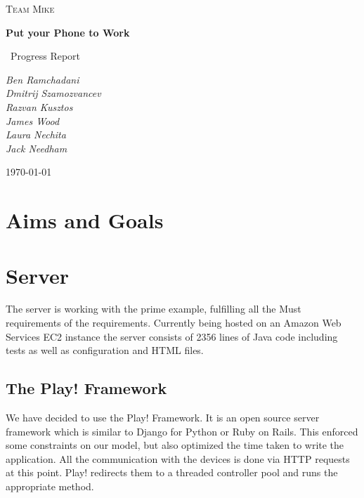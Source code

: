 \documentclass[a4paper,10pt]{article}
\title{}
\author{}
\date{}
\begin{document}
\begin{titlepage}
	\centering
	
	{\scshape\Large Team Mike\par}
	\vspace{4cm}
	{\huge\bfseries Put your Phone to Work\par}
	\vspace{1.5cm}
	{\Large\
	Progress Report
	\par}
	\vspace{2cm}
	{\Large\itshape 
	      Ben Ramchadani\\
	      Dmitrij Szamozvancev\\
	      Razvan Kusztos\\
	      James Wood \\
	      Laura Nechita \\
	      Jack Needham
	      \par}
	\vfill

	{\large \today\par}
\end{titlepage}
\maketitle
\tableofcontents
\newpage
\section{Aims and Goals}
\section{Server}

The server is working with the prime example, fulfilling all the Must requirements of the requirements.
Currently being hosted on an Amazon Web Services EC2 instance the server consists of 2356 lines of Java code including tests
as well as configuration and HTML files.


\subsection{The Play! Framework}
We have decided to use the Play! Framework. It is an open source server framework which is similar to Django for Python or Ruby on Rails. This enforced some constraints on our model, but also optimized the time taken to write the application. 
All the communication with the devices is done via HTTP requests at this point. Play! redirects them to a threaded controller pool and runs the appropriate method.
\end{document}
